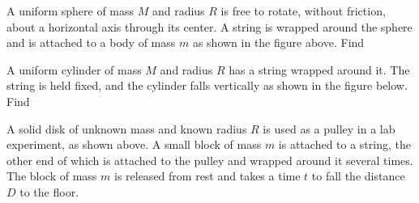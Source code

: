 \documentclass{../../oss-apphys-exam}
\newcounter{lastmc}
\begin{document}
\begin{questions}
  \setcounter{question}{\value{lastmc}}
  
  \question A uniform sphere of mass $M$ and radius $R$ is free to rotate,
  without friction, about a horizontal axis through its center. A string is
  wrapped around the sphere and is attached to a body of mass $m$ as shown in
  the figure above. Find
  \newpage

  \question A uniform cylinder of mass $M$ and radius $R$ has a string wrapped
  around it. The string is held fixed, and the cylinder falls vertically as
  shown in the figure below. Find
  \begin{center}
  \end{center}
  \newpage


  \question A solid disk of unknown mass and known radius $R$ is used as a
  pulley in a lab experiment, as shown above. A small block of mass $m$ is
  attached to a string, the other end of which is attached to the pulley and
  wrapped around it several times. The block of mass $m$ is released from rest
  and takes a time $t$ to fall the distance $D$ to the floor.
  \begin{parts}

\end{parts}
\end{questions}
\end{document}
